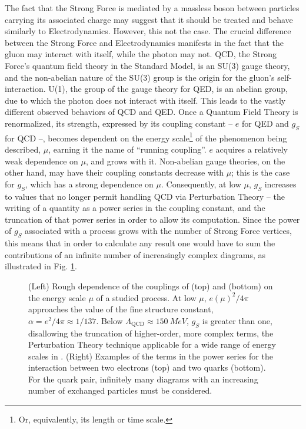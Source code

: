 The fact that the Strong Force is mediated by a massless boson between particles carrying its associated charge may suggest that it should be treated and behave similarly to Electrodynamics. However, this not the case. The crucial difference between the Strong Force and Electrodynamics manifests in the fact that the gluon may interact with itself, while the photon may not. \gls{QCD}, the Strong Force's quantum field theory in the Standard Model, is an SU(3) gauge theory, and the non-abelian nature of the SU(3) group is the origin for the gluon's self-interaction. U(1), the group of the gauge theory for \gls{QED}, is an abelian group, due to which the photon does not interact with itself. This leads to the vastly different observed behaviors of \gls{QCD} and \gls{QED}.
Once a Quantum Field Theory is renormalized, its strength, expressed by its coupling constant -- $e$ for \gls{QED} and $g_S$ for \gls{QCD} --, becomes dependent on the energy scale\footnote{Or, equivalently, its length or time scale.} of the phenomenon being described, $\mu$, earning it the name of ``running coupling''. $e$ acquires a relatively weak dependence on $\mu$, and grows with it. Non-abelian gauge theories, on the other hand, may have their coupling constants decrease with $\mu$; this is the case for $g_S$, which has a strong dependence on $\mu$. Consequently, at low $\mu$, $g_S$ increases to values that no longer permit handling \gls{QCD} via Perturbation Theory -- the writing of a quantity as a power series in the coupling constant, and the truncation of that power series in order to allow its computation. Since the power of $g_S$ associated with a process grows with the number of Strong Force vertices, this means that in order to calculate any result one would have to sum the contributions of an infinite number of increasingly complex diagrams, as illustrated in Fig. \ref{fig:running_QED_QCD}. 

\begin{figure}
\centering

\caption{(Left) Rough dependence of the couplings of  (top) and  (bottom) on the energy scale $\mu$ of a studied process. At low $\mu$, $e(\mu)^2/4\pi$ approaches the value of the fine structure constant, $\alpha = e^2/4\pi \approx 1/137$. Below $\Lambda_\text{QCD}\approx \qty{150}{MeV}$, $g_S$ is greater than one, disallowing the truncation of higher-order, more complex terms, the Perturbation Theory technique applicable for a wide range of energy scales in . (Right) Examples of the terms in the power series for the interaction between two electrons (top) and two quarks (bottom). For the quark pair, infinitely many diagrams with an increasing number of exchanged particles must be considered.}
\label{fig:running_QED_QCD}
\end{figure}

